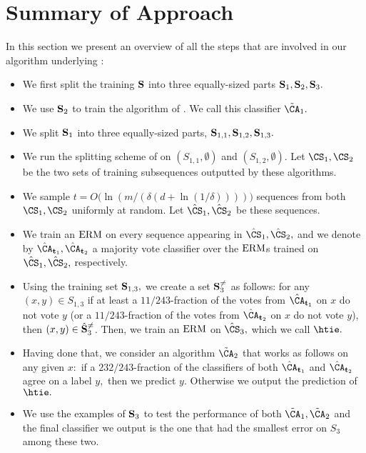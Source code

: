 \appendix 
{} 



\section{Summary of Approach}\label{apx:final-algo}
In this section we present an overview of all the steps that
are involved in our algorithm underlying :
\begin{itemize}
    \item We first split the training $\mathbf{S}$ into three equally-sized parts $\mathbf{S}_1, \mathbf{S}_2, \mathbf{S}_3.$

    \item We use $\mathbf{S}_2$ to train the algorithm of \citet{hanneke2024revisiting}. We call
    this classifier $\tilde \CA_1.$

    \item We split $\mathbf{S}_1$ into three equally-sized parts,
    $\mathbf{S}_{1,1}, \mathbf{S}_{1,2}, \mathbf{S}_{1,3}.$ 

    \item We run the splitting scheme of  on $(S_{1,1}, \emptyset)$ and $(S_{1,2}, \emptyset)$. 
    Let $\CS_1, \CS_2$ be the two sets of training subsequences outputted by these algorithms.

    \item We sample $t= O \big(\ln{\left(m/(\delta(d+\ln{\left(1/\delta \right)})) \right)} \big) $  sequences from both $\CS_1, \CS_2$
    uniformly at random. Let $\hat \CS_1, \hat \CS_2$
    be these sequences.

    \item We train an $\mathrm{ERM}$ on every sequence
    appearing in $\hat \CS_1, \hat \CS_2,$
    and we denote by $\hat \CA_{\rt_1}, \hat \CA_{\rt_2}$
    a majority vote classifier over the $\mathrm{ERM}$s trained on $\hat \CS_1, \hat \CS_2,$ respectively. 

    \item Using the training set $\mathbf{S}_{1,3},$
    we create a set $\mathbf{S}_3^{\not=}$ as follows:
    for any $(x,y) \in S_{1,3}$
    if at least a $11/243$-fraction of
    the votes from $\hat \CA_{\rt_1}$ on $x$
    do not vote $y$ (or a $11/243$-fraction of
    the votes from $\hat \CA_{\rt_2}$ on $x$
    do not vote $y$), then $(x,y) \in \hat {\mathbf{S}}_3^{\not=}$.
    Then, we train an $\mathrm{ERM}$ on $\hat \CS_3,$
    which we call $\htie.$

    \item Having done that, we consider 
    an algorithm $\tilde \CA_2$ that works 
    as follows on any given $x:$ if a $232/243$-fraction of the classifiers of both $\hat \CA_{\rt_1}$ and $\hat \CA_{\rt_2}$ agree on a label $y,$
    then we predict $y.$ Otherwise we output
    the prediction of $\htie.$

    \item We use the examples of $\mathbf{S}_3$
    to test the performance of both $\tilde \CA_1, \tilde \CA_2$ and the final classifier
    we output is the one that had the smallest
    error on $S_3$ among these two.
 \end{itemize}


